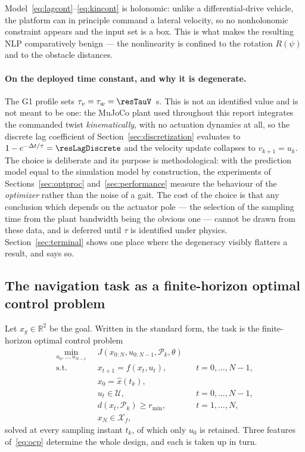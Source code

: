 \documentclass[11pt,a4paper]{article}
\newcommand{\R}{\mathbb{R}}
\begin{document}
Model~\eqref{eq:lagcont}--\eqref{eq:kincont} is holonomic: unlike a differential-drive vehicle, the platform
can in principle command a lateral velocity, so no nonholonomic constraint appears and the input set is a
box. This is what makes the resulting NLP comparatively benign --- the nonlinearity is confined to the
rotation $R(\psi)$ and to the obstacle distances.

\paragraph{On the deployed time constant, and why it is degenerate.}
The G1 profile sets $\tau_v=\tau_w=\resTauV$~s. This is not an identified value and is not meant to be one:
the MuJoCo plant used throughout this report integrates the commanded twist \emph{kinematically}, with no
actuation dynamics at all, so the discrete lag coefficient of Section~\ref{sec:discretization} evaluates to
$1-e^{-\Delta t/\tau}=\resLagDiscrete$ and the velocity update collapses to $v_{k+1}=u_k$. The choice is
deliberate and its purpose is methodological: with the prediction model equal to the simulation model by
construction, the experiments of Sections~\ref{sec:optproc} and~\ref{sec:performance} measure the behaviour
of the \emph{optimizer} rather than the noise of a gait. The cost of the choice is that any conclusion which
depends on the actuator pole --- the selection of the sampling time from the plant bandwidth being the
obvious one --- cannot be drawn from these data, and is deferred until $\tau$ is identified under physics.
Section~\ref{sec:terminal} shows one place where the degeneracy visibly flatters a result, and says so.

\subsection{The navigation task as a finite-horizon optimal control problem}
\label{sec:fhocp}

Let $x_g\in\R^2$ be the goal. Written in the standard form, the task is the finite-horizon optimal control
problem
\begin{subequations}
\label{eq:ocp}
\begin{align}
  \min_{u_0,\dots,u_{N-1}}\;\; & J\!\left(x_{0:N},u_{0:N-1},\mathcal{P}_k,\theta\right) \label{eq:ocp-cost}\\
  \text{s.t.}\quad & x_{t+1}=f(x_t,u_t), && t=0,\dots,N-1, \label{eq:ocp-dyn}\\
                   & x_0 = \hat x(t_k), \label{eq:ocp-init}\\
                   & u_t\in\mathcal{U}, && t=0,\dots,N-1, \label{eq:ocp-input}\\
                   & d\!\left(x_t,\mathcal{P}_k\right)\ge r_{\min}, && t=1,\dots,N, \label{eq:ocp-obs}\\
                   & x_N\in\mathcal{X}_f, \label{eq:ocp-term}
\end{align}
\end{subequations}
solved at every sampling instant $t_k$, of which only $u_0$ is retained. Three features of~\eqref{eq:ocp}
determine the whole design, and each is taken up in turn.
\end{document}

